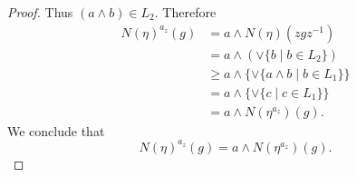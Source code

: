 \documentclass[10pt,a4paper]{amsart}
\begin{document}
\begin{proof}
	Thus $(a \wedge b) \in L_2$. Therefore
	\begin{equation*}
	\begin{split}
		N(\eta)^{a_z}(g) &= a \wedge N(\eta)(zgz^{-1}) \\
		&= a \wedge (\vee \{ b \mid b \in L_2 \}) \\
		&\geq a \wedge \{\vee \{ a \wedge b \mid b \in L_1 \}\} \\
		&= a \wedge \{\vee \{ c \mid c \in L_1\}\} \\
		&= a \wedge N(\eta^{a_z})(g).
	\end{split}
	\end{equation*}
    We conclude that 
    \[ N(\eta)^{a_z}(g) = a \wedge N(\eta^{a_z})(g). \]
\end{proof}
\end{document}
